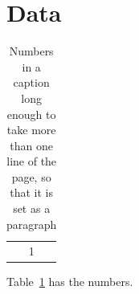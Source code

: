 \documentclass{article}
\begin{document}
\section{Data}
\begin{table}[h]
\centering
\caption{Numbers in a caption long enough to take more than one line of the page, so that it is set as a paragraph}\label{t}
\begin{tabular}{c}1\end{tabular}
\end{table}
Table~\ref{t} has the numbers.
\end{document}
